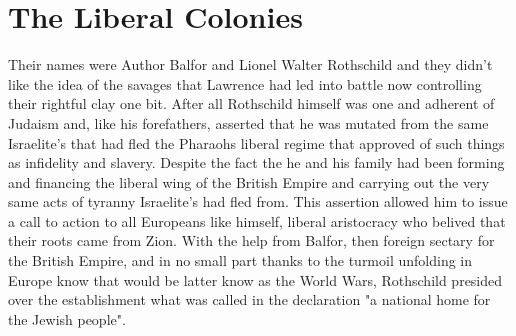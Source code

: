 \documentclass{article}
\begin{document}
\section{The Liberal Colonies}

Their names were Author Balfor and Lionel Walter Rothschild and they didn't like the idea of the savages that Lawrence had led into battle now controlling their rightful clay one bit. After all Rothschild himself was one and adherent of Judaism and, like his forefathers, asserted that he was mutated from the same Israelite's that had fled the Pharaohs liberal regime that approved of such things as infidelity and slavery. Despite the fact the he and his family had been forming and financing the liberal wing of the British Empire and carrying out the very same acts of tyranny Israelite's had fled from. This assertion allowed him to issue a call to action to all Europeans like himself, liberal aristocracy who belived that their roots came from Zion. With the help from Balfor, then foreign sectary for the British Empire, and in no small part thanks to the turmoil unfolding in Europe know that would be latter know as the World Wars, Rothschild presided over the establishment what was called in the declaration "a national home for the Jewish people". 
\end{document}
